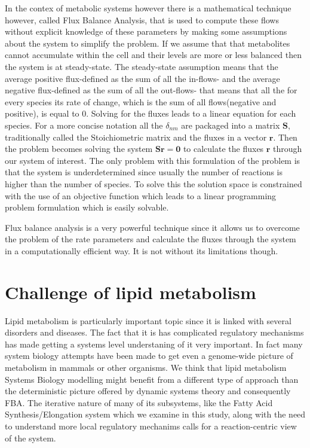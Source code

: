 In the contex of metabolic systems however there is a mathematical technique however, called Flux Balance
Analysis, that is used to compute these flows without explicit
knowledge of these parameters by making some assumptions about the
system to simplify the problem. If we assume that that metabolites
cannot accumulate within the cell and their levels are more or less
balanced then the system is at steady-state. The steady-state assumption means that the average positive flux-defined as the sum of
all the in-flows- and the average negative flux-defined as the sum of
all the out-flows- that means that all the for every species its rate
of change, which is the sum of all flows(negative and
positive), is equal to 0. Solving for the fluxes leads to a linear equation for each
species. For a more concise notation all the $\delta_{nm}$ are
packaged into a matrix $\mathbf{S}$, traditionally called the Stoichiometric
matrix and the fluxes in a vector $\mathbf{r}$. Then the problem
becomes solving the system $\mathbf{Sr} = \mathbf{0}$ to calculate the
fluxes $\mathbf{r}$ through our system of interest. The only problem
with this formulation of the problem is that the system is
underdetermined since usually the number of reactions is higher than
the number of species. To solve this the solution space is constrained
with the use of an objective function which leads to a linear
programming problem formulation which is easily solvable.

Flux balance analysis is a very powerful technique since it allows us
to overcome the problem of the rate parameters and calculate the
fluxes through the system in a computationally efficient way. It is
not without its limitations though.

\section{Challenge of lipid metabolism}

Lipid metabolism is particularly important topic since it is linked
with several disorders and diseases. The fact that it is has
complicated regulatory mechanisms has made getting a systems level
understaning of it very important. In fact many system biology
attempts have been made to get even a genome-wide picture of metabolism in
mammals or other organisms. We think that lipid metabolism Systems
Biology modelling might benefit from a different type of approach than
the deterministic picture offered by dynamic systems theory and
consequently FBA. The iterative nature of many of its subsystems, like
the Fatty Acid Synthesis/Elongation system which we examine in this
study, along with the need to understand more local regulatory
mechanims calls for a reaction-centric view of the system.

